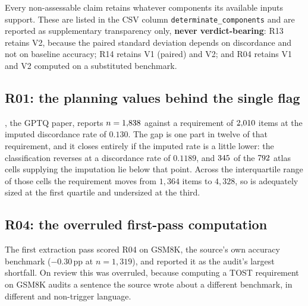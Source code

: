 Every non-assessable claim retains whatever components its available inputs
support. These are listed in the CSV column \texttt{determinate\_components} and
are reported as supplementary transparency only, \textbf{never verdict-bearing}:
R13 retains V2, because the paired standard deviation depends on discordance and
not on baseline accuracy; R14 retains V1 (paired) and V2; and R04 retains V1 and
V2 computed on a substituted benchmark.

\subsection{R01: the planning values behind the single flag}
\label{app:audit:r01}

\AuditSensitiveClaim{}, the GPTQ paper, reports $n = 1{,}838{}$ against
a requirement of $2{,}010{}$ items at the imputed discordance rate of
$0.130$. The gap is one part in twelve of that requirement, and it closes
entirely if the imputed rate is a little lower: the classification reverses at a
discordance rate of $0.1189$, and $345{}$ of the
$792{}$ atlas cells supplying the imputation lie below that
point. Across the interquartile range of those cells the requirement moves from
$1{,}364$ items to $4{,}328$, so \AuditSensitiveClaim{} is adequately sized at
the first quartile and undersized at the third.

\subsection{R04: the overruled first-pass computation}
\label{app:audit:r04detail}

The first extraction pass scored R04 on GSM8K, the source's own accuracy
benchmark ($-0.30$\,pp at $n = 1{,}319$), and reported it as the audit's largest
shortfall. On review this was overruled, because computing a TOST requirement on
GSM8K audits a sentence the source wrote about a different benchmark, in
different and non-trigger language.

